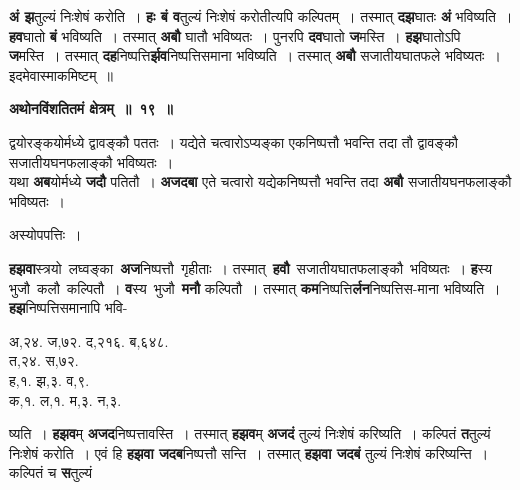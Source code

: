 \documentclass[11pt, openany]{book}
\begin{document}
\noindent \textbf{अं झ}तुल्यं निःशेषं करोति~। \textbf{हः बं व}तुल्यं निःशेषं करोतीत्यपि कल्पितम्~। तस्मात् \textbf{दझ}घातः \textbf{अं} भविष्यति~। \textbf{हव}घातो \textbf{बं} भविष्यति~। तस्मात् \textbf{अबौ} घातौ भविष्यतः~। पुनरपि \textbf{दव}घातो \textbf{ज}मस्ति~। \textbf{हझ}घातोऽपि \textbf{ज}मस्ति~। तस्मात् \textbf{दह}निष्पत्ति\textbf{र्झव}निष्पत्तिसमाना भविष्यति~। तस्मात् \textbf{अबौ} सजातीयघातफले भविष्यतः~। इदमेवास्माकमिष्टम्~॥ 
\vspace{2mm}

\begin{center}
\textbf{अथोनविंशतितमं क्षेत्रम्~॥~१९~॥}
\end{center}

 {\ab द्वयोरङ्कयोर्मध्ये द्वावङ्कौ पततः~। यद्येते चत्वारोऽप्यङ्का एकनिष्पत्तौ भवन्ति तदा तौ द्वावङ्कौ सजातीयघनफलाङ्कौ भविष्यतः~। }\\

 यथा \textbf{अब}योर्मध्ये \textbf{जदौ} पतितौ~। \textbf{अजदबा} एते चत्वारो यद्येकनिष्पत्तौ भवन्ति तदा \textbf{अबौ} सजातीयघनफलाङ्कौ भविष्यतः~। 

\begin{center}
अस्योपपत्तिः~।
\end{center}
\vspace{-3mm}

\begin{flushleft}
\begin{minipage}[t]{0.55\textwidth}
\hspace{4mm} \textbf{हझवा}स्त्रयो \,लघ्वङ्का \,\textbf{अज}निष्पत्तौ \,गृहीताः~। तस्मात् \,\textbf{हवौ} \,सजातीयघातफलाङ्कौ \,भविष्यतः~। \textbf{ह}स्य \,भुजौ \,कलौ  \,कल्पितौ~। \textbf{व}स्य \,भुजौ \,\textbf{मनौ} कल्पितौ~। तस्मात्  \textbf{कम}निष्पत्ति\textbf{र्लन}निष्पत्तिस-माना \;भविष्यति~। \,\textbf{हझ}निष्पत्तिसमानापि \;भवि-
\end{minipage} 
\hfill
\begin{minipage}[t]{0.35\textwidth}
अ,२४. ज,७२. द,२१६. ब,६४८. \\
त,२४. स,७२.\\
ह,१. झ,३. व,९.\\
क,१. ल,१. म,३. न,३.
\end{minipage}
\end{flushleft}
\vspace{-3mm}

\noindent ष्यति~। \textbf{हझव}म् \textbf{अजद}निष्पत्तावस्ति~। तस्मात् \textbf{हझव}म् \textbf{अजदं} तुल्यं निःशेषं करिष्यति~। कल्पितं \textbf{त}तुल्यं निःशेषं करोति~। एवं हि \textbf{हझवा जदब}निष्पत्तौ सन्ति~। तस्मात् \textbf{हझवा जदबं} तुल्यं निःशेषं करिष्यन्ति~। कल्पितं च \textbf{स}तुल्यं 
\end{document}
